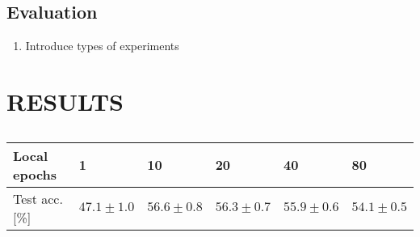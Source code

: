 \documentclass{article}
\begin{document}
\subsection{Evaluation}
\begin{enumerate}
    \item Introduce types of experiments
\end{enumerate}

\section{RESULTS}%
\label{sec:results}

\begin{table}
        \footnotesize
        \begin{center}
                \begin{tabular}{l l l l l l}
                        Local epochs & 1 & 10 & 20 & 40 & 80 \\
                        \hline
                        Test acc. [\%] & $47.1 \pm 1.0$ & $56.6 \pm 0.8$ & $56.3 \pm 0.7$ & $55.9 \pm 0.6$ & $54.1 \pm 0.5$ \\
                \end{tabular}
        \end{center}
        \caption{}
        \label{tab:local_epochs}
\end{table}
\end{document}
